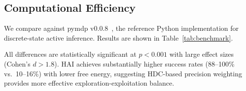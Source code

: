 \documentclass[10pt,letterpaper]{article}
\begin{document}
\subsection{Computational Efficiency}

We compare against pymdp v0.0.8~\cite{heins2022pymdp}, the reference Python implementation for discrete-state active inference. Results are shown in Table~\ref{tab:benchmark}.

\begin{table}[ht]
\centering
\caption{HAI vs.\ pymdp benchmark results.}
\label{tab:benchmark}
\small
{}
\end{table}

\begin{table}[ht]
\centering
\caption{Aggregate speedups with 95\% confidence intervals.}
\label{tab:speedups}
\small
{}
\end{table}

All differences are statistically significant at $p < 0.001$ with large effect sizes (Cohen's $d > 1.8$). HAI achieves substantially higher success rates (88--100\% vs.\ 10--16\%) with lower free energy, suggesting HDC-based precision weighting provides more effective exploration-exploitation balance.
\end{document}
